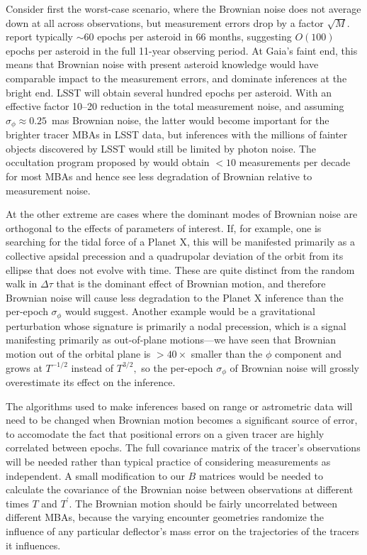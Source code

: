 \documentclass[linenumbers, onecolumn]{aastex631}
\newcommand{\matB}{B}
\begin{document}
Consider first the worst-case scenario, where the Brownian noise does
not average down at all across observations, but measurement errors
drop by a factor $\sqrt{M}.$   \citet{gaiafpr} report typically $\sim60$ epochs per asteroid in 66 months, suggesting $O(100)$ epochs per asteroid in the full 11-year observing period.  At Gaia's faint end, this means that Brownian noise with present asteroid knowledge would have comparable impact to the measurement errors, and dominate inferences at the bright end.  LSST will obtain several hundred epochs per asteroid.  With an effective factor 10--20 reduction in the total measurement noise, and assuming $\sigma_\phi\approx0.25$~mas Brownian noise, the latter would become important for the brighter tracer MBAs in LSST data, but inferences with the millions of fainter objects discovered by LSST would still be limited by photon noise.  The occultation program proposed by \citet{occultations} would obtain $<10$ measurements per decade for most MBAs and hence see less degradation of Brownian relative to measurement noise.

At the other extreme are cases where the dominant modes of Brownian noise are orthogonal to the effects of parameters of interest.  
If, for example, one is searching for the tidal force of a Planet X, this will be manifested primarily as a collective apsidal precession and a quadrupolar deviation of the orbit from its ellipse that does not evolve with time.  These are quite distinct from the random walk in $\Delta\tau$ that is the dominant effect of Brownian motion, and therefore Brownian noise will cause less degradation to the Planet X inference than the per-epoch $\sigma_\phi$ would suggest.  Another example would be a gravitational perturbation whose signature is primarily a nodal precession, which is a signal manifesting primarily as out-of-plane motions---we have seen that Brownian motion out of the orbital plane is $>40\times$ smaller than the $\phi$ component and grows at $T^{-1/2}$ instead of $T^{3/2},$ so the per-epoch $\sigma_\phi$ of Brownian noise will grossly overestimate its effect on the inference.

The algorithms used to make inferences based on range or astrometric
data will need to be changed when Brownian motion becomes a
significant source of error, to accomodate the fact that positional
errors on a given tracer are highly correlated between epochs.  The
full covariance matrix of the tracer's observations will be needed
rather than typical practice of considering measurements as
independent.  A small modification to our $\matB$ matrices would be
needed to calculate the covariance of the Brownian noise between
observations at different times $T$ and $T^\prime.$  The Brownian
motion should be fairly uncorrelated between different MBAs, because
the varying encounter geometries randomize the influence of any
particular deflector's mass error on the trajectories of the tracers
it influences.
\end{document}
